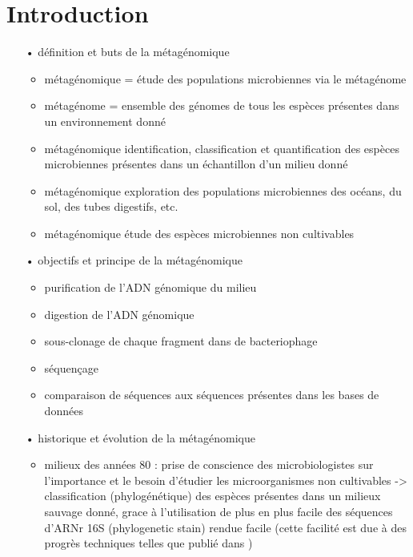 \section{Introduction}

	\begin{itemize}
		\item[•] définition et buts de la métagénomique
		  \begin{itemize}
			\item métagénomique = étude des populations microbiennes via le métagénome
			\item métagénome = ensemble des génomes de tous les espèces présentes dans un environnement donné
			\item métagénomique \rightarrow identification, classification et quantification des espèces microbiennes présentes dans un échantillon d'un milieu donné
                        \item métagénomique \rightarrow exploration des populations microbiennes des océans, du sol, des tubes digestifs, etc.
                        \item métagénomique \rightarrow étude des espèces microbiennes non cultivables
		  \end{itemize}
		\item[•] objectifs et principe de la métagénomique
                  \begin{itemize}
                  \item purification de l'ADN génomique du milieu
                  \item digestion de l'ADN génomique
                  \item sous-clonage de chaque fragment dans de bacteriophage
                  \item séquençage
                  \item comparaison de séquences aux séquences présentes dans les bases de données
                  \end{itemize}
                \item[•] historique et évolution de la métagénomique \cite{Handelsman2004a}
                  \begin{itemize}
                  \item milieux des années 80 : prise de conscience des microbiologistes sur l'importance et le besoin d'étudier les microorganismes non cultivables -> classification (phylogénétique) des espèces présentes dans un milieux sauvage donné, grace à l'utilisation de plus en plus facile des séquences d'ARNr 16S (phylogenetic stain) rendue facile (cette facilité est due à des progrès techniques telles que publié dans \cite{lane1985})

\end{itemize}
\end{itemize}
